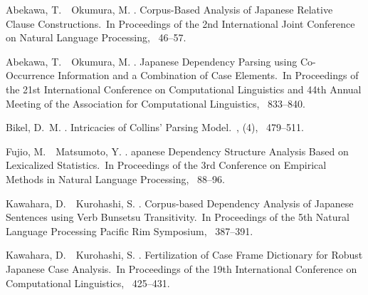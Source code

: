 \documentclass[english]{jnlp_1.4_rep}
\begin{document}
{
\addtolength{\baselineskip}{-1pt}

\begin{thebibliography}{}

Abekawa, T.\BBACOMMA\ \BBA\ Okumura, M. \BBCP.
\newblock \BBOQ Corpus-Based Analysis of Japanese Relative Clause
  \mbox{Constructions}.\BBCQ\
\newblock In {\Bem Proceedings of the 2nd International Joint Conference on
  Natural \mbox{Language} Processing}, \mbox{\BPGS\ 46--57}.

Abekawa, T.\BBACOMMA\ \BBA\ Okumura, M. \BBCP.
\newblock \BBOQ Japanese Dependency Parsing using Co-Occurrence Information and
  a Combination of Case Elements.\BBCQ\
\newblock In {\Bem Proceedings of the 21st International Conference on
  Computational Linguistics and 44th Annual Meeting of the Association for
  Computational Linguistics}, \mbox{\BPGS\ 833--840}.

\bibitem[\protect\BCAY{Bikel}{Bikel}{2004}]{Bikel2004}
Bikel, D.~M. \BBOP 2004\BBCP.
\newblock \BBOQ Intricacies of {C}ollins' Parsing Model.\BBCQ\
, {}  (4), \mbox{\BPGS\
  479--511}.

Fujio, M.\BBACOMMA\ \BBA\ Matsumoto, Y. \BBCP.
\newblock \BBOQ {J}apanese Dependency Structure Analysis Based on
  \mbox{Lexicalized} Statistics.\BBCQ\
\newblock In {\Bem Proceedings of the 3rd Conference on Empirical Methods in
  Natural Language Processing}, \mbox{\BPGS\ 88--96}.

Kawahara, D.\BBACOMMA\ \BBA\ Kurohashi, S. \BBCP.
\newblock \BBOQ Corpus-based Dependency Analysis of {J}apanese \mbox{Sentences}
  using Verb Bunsetsu Transitivity.\BBCQ\
\newblock In {\Bem Proceedings of the 5th Natural Language Processing Pacific
  Rim Symposium}, \mbox{\BPGS\ 387--391}.

Kawahara, D.\BBACOMMA\ \BBA\ Kurohashi, S. \BBCP.
\newblock \BBOQ Fertilization of Case Frame Dictionary for Robust {J}apanese
  Case Analysis.\BBCQ\
\newblock In {\Bem Proceedings of the 19th International Conference on
  Computational Linguistics}, \mbox{\BPGS\ 425--431}.


\end{thebibliography}}
\end{document}
